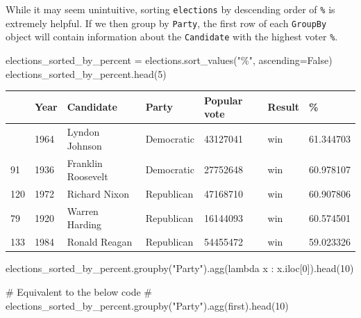 \documentclass[
  letterpaper,
  DIV=11,
  numbers=noendperiod]{scrreprt}
\newenvironment{Shaded}{\begin{snugshade}}{\end{snugshade}}
\newcommand{\CommentTok}[1]{\textcolor[rgb]{0.37,0.37,0.37}{#1}}
\newcommand{\DecValTok}[1]{\textcolor[rgb]{0.68,0.00,0.00}{#1}}
\newcommand{\KeywordTok}[1]{\textcolor[rgb]{0.00,0.23,0.31}{#1}}
\newcommand{\NormalTok}[1]{\textcolor[rgb]{0.00,0.23,0.31}{#1}}
\newcommand{\OperatorTok}[1]{\textcolor[rgb]{0.37,0.37,0.37}{#1}}
\newcommand{\StringTok}[1]{\textcolor[rgb]{0.13,0.47,0.30}{#1}}
\newcommand{\VariableTok}[1]{\textcolor[rgb]{0.07,0.07,0.07}{#1}}
\begin{document}
While it may seem unintuitive, sorting \texttt{elections} by descending
order of \texttt{\%} is extremely helpful. If we then group by
\texttt{Party}, the first row of each \texttt{GroupBy} object will
contain information about the \texttt{Candidate} with the highest voter
\texttt{\%}.

\begin{Shaded}
\begin{Highlighting}[]
\NormalTok{elections\_sorted\_by\_percent }\OperatorTok{=}\NormalTok{ elections.sort\_values(}\StringTok{"\%"}\NormalTok{, ascending}\OperatorTok{=}\VariableTok{False}\NormalTok{)}
\NormalTok{elections\_sorted\_by\_percent.head(}\DecValTok{5}\NormalTok{)}
\end{Highlighting}
\end{Shaded}

\begin{longtable}[]{@{}lllllll@{}}
\toprule\noalign{}
& Year & Candidate & Party & Popular vote & Result & \% \\
\midrule\noalign{}
\endhead
\bottomrule\noalign{}
\endlastfoot
114 & 1964 & Lyndon Johnson & Democratic & 43127041 & win & 61.344703 \\
91 & 1936 & Franklin Roosevelt & Democratic & 27752648 & win &
60.978107 \\
120 & 1972 & Richard Nixon & Republican & 47168710 & win & 60.907806 \\
79 & 1920 & Warren Harding & Republican & 16144093 & win & 60.574501 \\
133 & 1984 & Ronald Reagan & Republican & 54455472 & win & 59.023326 \\
\end{longtable}

\begin{Shaded}
\begin{Highlighting}[]
\NormalTok{elections\_sorted\_by\_percent.groupby(}\StringTok{"Party"}\NormalTok{).agg(}\KeywordTok{lambda}\NormalTok{ x : x.iloc[}\DecValTok{0}\NormalTok{]).head(}\DecValTok{10}\NormalTok{)}

\CommentTok{\# Equivalent to the below code}
\CommentTok{\# elections\_sorted\_by\_percent.groupby("Party").agg(\textquotesingle{}first\textquotesingle{}).head(10)}
\end{Highlighting}
\end{Shaded}
\end{document}
